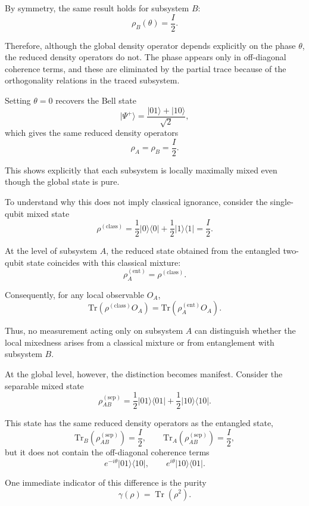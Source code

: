 \documentclass[a4paper]{article}
\begin{document}
By symmetry, the same result holds for subsystem $B$:
\[
\rho_B(\theta) = \frac{I}{2}.
\]

Therefore, although the global density operator depends explicitly on the phase $\theta$, the reduced density operators do not. The phase appears only in off-diagonal coherence terms, and these are eliminated by the partial trace because of the orthogonality relations in the traced subsystem.

\medskip

Setting $\theta = 0$ recovers the Bell state
\[
|\Psi^+\rangle = \frac{|01\rangle + |10\rangle}{\sqrt{2}},
\]
which gives the same reduced density operators
\[
\rho_A = \rho_B = \frac{I}{2}.
\]

This shows explicitly that each subsystem is locally maximally mixed even though the global state is pure.

\medskip

To understand why this does not imply classical ignorance, consider the single-qubit mixed state
\[
\rho^{(\mathrm{class})}
=
\frac{1}{2}|0\rangle\langle 0|
+
\frac{1}{2}|1\rangle\langle 1|
=
\frac{I}{2}.
\]

At the level of subsystem $A$, the reduced state obtained from the entangled two-qubit state coincides with this classical mixture:
\[
\rho_A^{(\mathrm{ent})} = \rho^{(\mathrm{class})}.
\]

Consequently, for any local observable $O_A$,
\[
\mathrm{Tr}(\rho^{(\mathrm{class})} O_A)
=
\mathrm{Tr}(\rho_A^{(\mathrm{ent})} O_A).
\]

Thus, no measurement acting only on subsystem $A$ can distinguish whether the local mixedness arises from a classical mixture or from entanglement with subsystem $B$.

\medskip

At the global level, however, the distinction becomes manifest. Consider the separable mixed state
\[
\rho_{AB}^{(\mathrm{sep})}
=
\frac{1}{2}|01\rangle\langle 01|
+
\frac{1}{2}|10\rangle\langle 10|.
\]

This state has the same reduced density operators as the entangled state,
\[
\mathrm{Tr}_B(\rho_{AB}^{(\mathrm{sep})}) = \frac{I}{2},
\qquad
\mathrm{Tr}_A(\rho_{AB}^{(\mathrm{sep})}) = \frac{I}{2},
\]
but it does not contain the off-diagonal coherence terms
\[
e^{-i\theta}|01\rangle\langle 10|,
\qquad
e^{i\theta}|10\rangle\langle 01|.
\]

One immediate indicator of this difference is the purity
\[
\gamma(\rho) = \operatorname{Tr}(\rho^2).
\]
\end{document}
